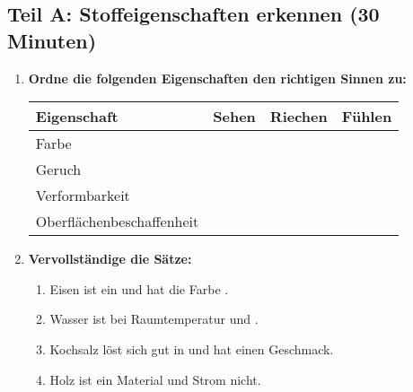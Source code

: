 \subsection*{Teil A: Stoffeigenschaften erkennen (30 Minuten)}

\begin{enumerate}[label=\arabic*.]
    \item \textbf{Ordne die folgenden Eigenschaften den richtigen Sinnen zu:}
    \vspace{0.5cm}

    \begin{tabular}{|p{4cm}|p{4cm}|p{4cm}|p{4cm}|}
        \hline
        \textbf{Eigenschaft} & \textbf{Sehen} & \textbf{Riechen} & \textbf{Fühlen} \\
        \hline
        Farbe & & & \\
        \hline
        Geruch & & & \\
        \hline
        Verformbarkeit & & & \\
        \hline
        Oberflächenbeschaffenheit & & & \\
        \hline
    \end{tabular}

    \vspace{1cm}

    \item \textbf{Vervollständige die Sätze:}
    \vspace{0.5cm}

    \begin{enumerate}[label=\alph*)]
        \item Eisen ist ein \underline{\hspace{3cm}} und hat die Farbe \underline{\hspace{3cm}}.
        \item Wasser ist bei Raumtemperatur \underline{\hspace{3cm}} und \underline{\hspace{3cm}}.
        \item Kochsalz löst sich gut in \underline{\hspace{3cm}} und hat einen \underline{\hspace{3cm}} Geschmack.
        \item Holz ist ein \underline{\hspace{3cm}} Material und \underline{\hspace{3cm}} Strom nicht.
    \end{enumerate}


\end{enumerate}

